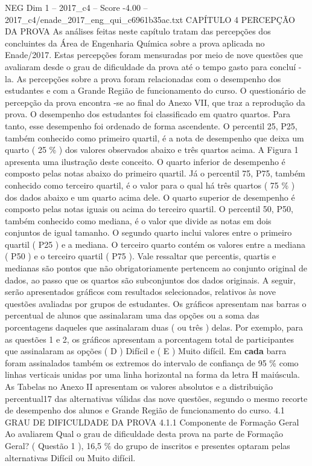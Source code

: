 \begin{textsample}{NEG Dim 1 – 2017\_c4 – Score -4.00 – 2017\_c4/enade\_2017\_eng\_qui\_c6961b35ac.txt}  \label{ex:f1_neg_162}
CAPÍTULO 4 PERCEPÇÃO DA PROVA As análises feitas neste capítulo tratam das percepções dos concluintes da Área de Engenharia Química sobre a prova aplicada no Enade/2017.
Estas percepções foram mensuradas por meio de nove questões que avaliaram desde o grau de dificuldade da prova até o tempo gasto para concluí -la.
As percepções sobre a prova foram relacionadas com o desempenho dos estudantes e com a Grande Região de funcionamento do curso.
O questionário de percepção da prova encontra -se ao final do Anexo VII, que traz a reprodução da prova.
O desempenho dos estudantes foi classificado em quatro quartos.
Para tanto, esse desempenho foi ordenado de forma ascendente.
O percentil 25, P25, também conhecido como primeiro quartil, é a nota de desempenho que deixa um quarto ( 25 \% ) dos valores observados abaixo e três quartos acima.
A Figura 1 apresenta uma ilustração deste conceito.
O quarto inferior de desempenho é composto pelas notas abaixo do primeiro quartil.
Já o percentil 75, P75, também conhecido como terceiro quartil, é o valor para o qual há três quartos ( 75 \% ) dos dados abaixo e um quarto acima dele.
O quarto superior de desempenho é composto pelas notas iguais ou acima do terceiro quartil.
O percentil 50, P50, também conhecido como mediana, é o valor que divide as notas em dois conjuntos de igual tamanho.
O segundo quarto inclui valores entre o primeiro quartil ( P25 ) e a mediana.
O terceiro quarto contém os valores entre a mediana ( P50 ) e o terceiro quartil ( P75 ).
Vale ressaltar que percentis, quartis e medianas são pontos que não obrigatoriamente pertencem ao conjunto original de dados, ao passo que os quartos são subconjuntos dos dados originais.
A seguir, serão apresentados gráficos com resultados selecionados, relativos às nove questões avaliadas por grupos de estudantes.
Os gráficos apresentam nas barras o percentual de alunos que assinalaram uma das opções ou a soma das porcentagens daqueles que assinalaram duas ( ou três ) delas.
Por exemplo, para as questões 1 e 2, os gráficos apresentam a porcentagem total de participantes que assinalaram as opções ( D ) Difícil e ( E ) Muito difícil.
Em \textbf{cada} barra foram assinalados também os extremos do intervalo de confiança de 95 \% como linhas verticais unidas por uma linha horizontal na forma da letra H maiúscula.
As Tabelas no Anexo II apresentam os valores absolutos e a distribuição percentual17 das alternativas válidas das nove questões, segundo o mesmo recorte de desempenho dos alunos e Grande Região de funcionamento do curso. 4.1 GRAU DE DIFICULDADE DA PROVA 4.1.1 Componente de Formação Geral Ao avaliarem Qual o grau de dificuldade desta prova na parte de Formação Geral? ( Questão 1 ), 16,5 \% do grupo de inscritos e presentes optaram pelas alternativas Difícil ou Muito difícil.

\end{textsample}
